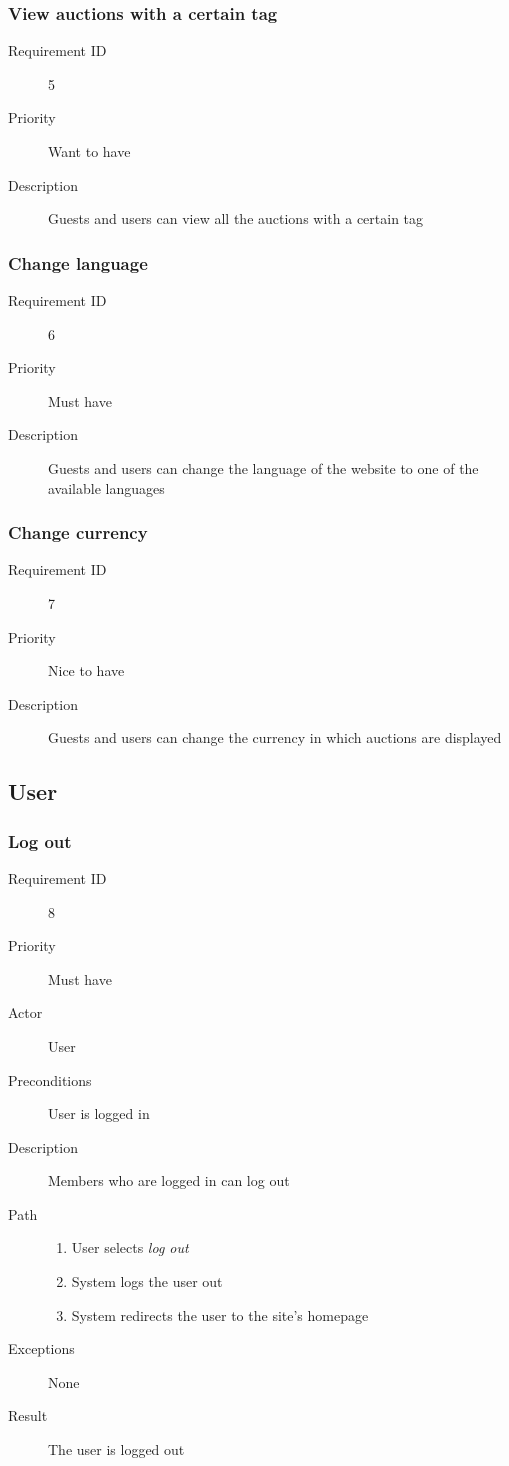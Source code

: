 		\subsubsection{View auctions with a certain tag}
			\begin{description}
				\item[Requirement ID] 5
				\item[Priority] Want to have
				\item[Description] Guests and users can view all the auctions with a certain tag
			\end{description}
		\subsubsection{Change language}
			\begin{description}
				\item[Requirement ID] 6
				\item[Priority] Must have
				\item[Description] Guests and users can change the language of the website to one
					of the available languages
			\end{description}
		\subsubsection{Change currency}
			\begin{description}
				\item[Requirement ID] 7
				\item[Priority] Nice to have
				\item[Description] Guests and users can change the currency in which auctions are
					displayed
			\end{description}
	\subsection{User}
		\subsubsection{Log out}
			\begin{description}
				\item[Requirement ID] 8
				\item[Priority] Must have
				\item[Actor] User
				\item[Preconditions] User is logged in
				\item[Description] Members who are logged in can log out
				\item[Path]
 					\begin{enumerate}
						\item User selects \emph{log out}
						\item System logs the user out
						\item System redirects the user to the site's homepage
					\end{enumerate}
				\item[Exceptions] None
				\item[Result] The user is logged out
			\end{description}
